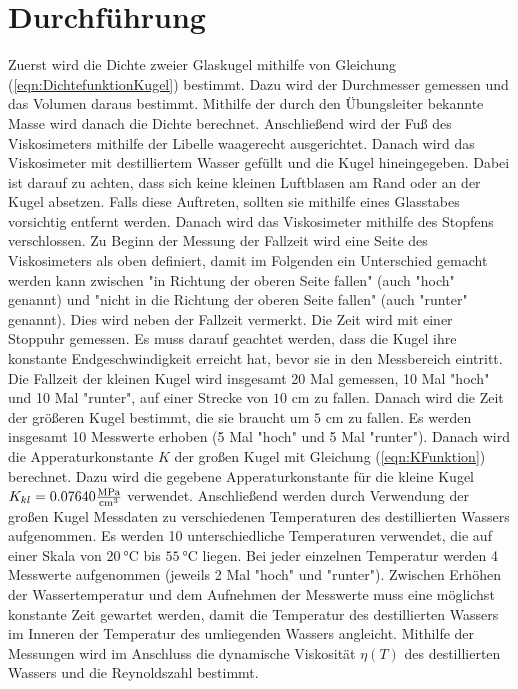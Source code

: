 \section{Durchführung}
\label{sec:Durchführung}
Zuerst wird die Dichte zweier Glaskugel mithilfe von Gleichung (\ref{eqn:DichtefunktionKugel}) bestimmt. 
Dazu wird der Durchmesser gemessen und das Volumen daraus bestimmt. Mithilfe der durch den Übungsleiter 
bekannte Masse wird danach die Dichte berechnet. 
Anschließend wird der Fuß des Viskosimeters mithilfe der Libelle waagerecht ausgerichtet. 
Danach wird das Viskosimeter mit destilliertem Wasser gefüllt und die Kugel hineingegeben. 
Dabei ist darauf zu achten, dass sich keine kleinen Luftblasen am Rand oder an der Kugel absetzen. 
Falls diese Auftreten, sollten sie mithilfe eines Glasstabes vorsichtig entfernt werden. Danach wird 
das Viskosimeter mithilfe des Stopfens verschlossen. Zu Beginn der Messung der Fallzeit wird eine Seite 
des Viskosimeters als oben definiert, damit im Folgenden ein Unterschied gemacht werden kann zwischen 
"in Richtung der oberen Seite fallen" (auch "hoch" genannt) und "nicht in die Richtung der oberen Seite fallen"
(auch "runter" genannt). Dies wird neben der Fallzeit vermerkt. Die Zeit wird mit einer Stoppuhr gemessen. 
Es muss darauf geachtet werden, dass
die Kugel ihre konstante Endgeschwindigkeit erreicht hat, bevor sie in den Messbereich eintritt. 
Die Fallzeit der kleinen Kugel wird insgesamt 20 Mal gemessen, 10 Mal "hoch" und 10 Mal "runter", auf einer Strecke von 
$10$ \unit{\centi\meter} zu fallen. Danach wird die Zeit der größeren Kugel bestimmt, 
die sie braucht um $5$ \unit{\centi\meter} zu fallen.
Es werden insgesamt 10 Messwerte erhoben (5 Mal "hoch" und 5 Mal "runter").
Danach wird die Apperaturkonstante $K$ der großen Kugel mit Gleichung (\ref{eqn:KFunktion}) berechnet. Dazu wird die gegebene 
Apperaturkonstante für die kleine Kugel $K_{kl} = 0.07640 \unit[per-mode=fraction]{\mega\pascal\per\cubic\centi\meter}$ 
verwendet. 
Anschließend werden durch Verwendung der großen Kugel Messdaten zu verschiedenen Temperaturen des 
destillierten Wassers aufgenommen. 
Es werden 10 unterschiedliche Temperaturen verwendet, die auf einer Skala von $\SI{20}{\celsius}$ bis 
$\SI{55}{\celsius}$ liegen. Bei jeder einzelnen Temperatur werden 4 Messwerte aufgenommen (jeweils 2 Mal 
"hoch" und "runter").
Zwischen Erhöhen der Wassertemperatur und dem Aufnehmen der Messwerte muss eine möglichst konstante Zeit 
gewartet werden, damit die Temperatur des destillierten Wassers im Inneren der Temperatur des umliegenden 
Wassers angleicht. 
Mithilfe der Messungen wird im Anschluss die dynamische Viskosität $\eta(T)$ des destillierten Wassers und die 
Reynoldszahl bestimmt.


